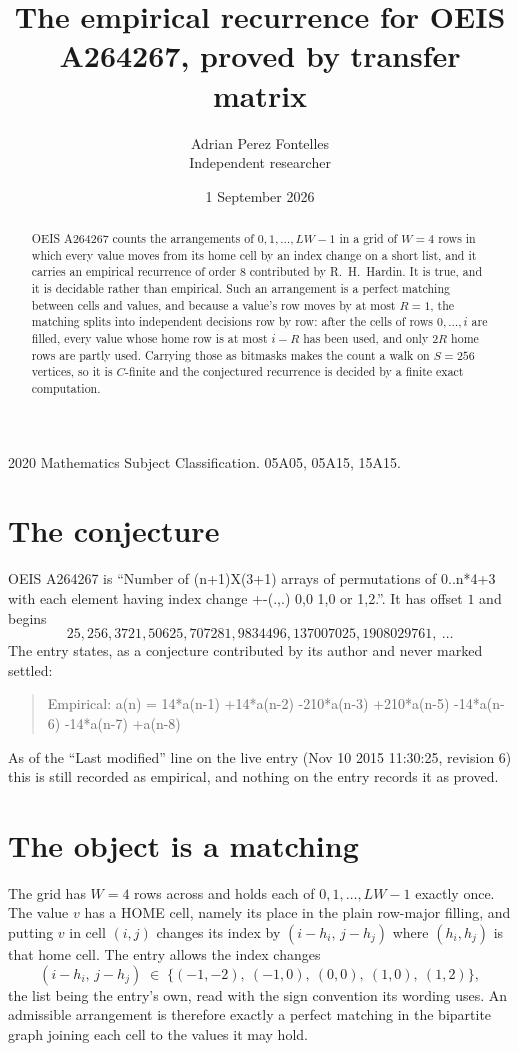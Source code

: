 \documentclass[11pt,a4paper]{article}
\title{The empirical recurrence for OEIS A264267, proved by transfer matrix}
\author{Adrian Perez Fontelles\\ \small Independent researcher}
\date{1 September 2026}
\theoremstyle{plain}
\theoremstyle{definition}
\begin{document}
\maketitle

\begin{abstract}
OEIS A264267 counts the arrangements of $0,1,\dots,LW-1$ in a grid of $W=4$ rows in which
every value moves from its home cell by an index change on a short list, and it carries an
empirical recurrence of order $8$ contributed by R.~H.~Hardin. It is true, and it is
decidable rather than empirical. Such an arrangement is a perfect matching between cells and
values, and because a value's row moves by at most $R=1$, the matching splits into
independent decisions row by row: after the cells of rows $0,\dots,i$ are filled,
every value whose home row is at most $i-R$ has been used, and only $2R$ home rows are
partly used. Carrying those as bitmasks makes the count a walk on $S=256$ vertices, so it is
$C$-finite and the conjectured recurrence is decided by a finite exact computation.
\end{abstract}

\noindent\small 2020 Mathematics Subject Classification. 05A05, 05A15, 15A15.\normalsize

\section{The conjecture}

OEIS A264267 is ``Number of (n+1)X(3+1) arrays of permutations of 0..n*4+3 with each element having index change +-(.,.) 0,0 1,0 or 1,2.''. It has offset $1$ and begins
\[
25, 256, 3721, 50625, 707281, 9834496, 137007025, 1908029761,\ \dots
\]
The entry states, as a conjecture contributed by its author and never marked settled:
\begin{quote}
Empirical: a(n) = 14*a(n-1) +14*a(n-2) -210*a(n-3) +210*a(n-5) -14*a(n-6) -14*a(n-7) +a(n-8)
\end{quote}
As of the ``Last modified'' line on the live entry (Nov 10 2015 11:30:25, revision 6) this is still
recorded as empirical, and nothing on the entry records it as proved.

\section{The object is a matching}

The grid has $W=4$ rows across and holds each of $0,1,\dots,LW-1$ exactly once. The value
$v$ has a HOME cell, namely its place in the plain row-major filling, and putting $v$ in cell
$(i,j)$ changes its index by $(i-h_i,\,j-h_j)$ where $(h_i,h_j)$ is that home cell. The entry
allows the index changes
\[
(i-h_i,\,j-h_j)\;\in\;\{(-1,-2),\ (-1,0),\ (0,0),\ (1,0),\ (1,2)\},
\]
the list being the entry's own, read with the sign convention its wording uses. An admissible
arrangement is therefore exactly a perfect matching in the bipartite graph joining each cell to
the values it may hold.
\end{document}
